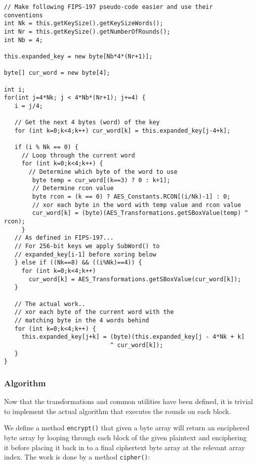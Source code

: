 \begin{lstlisting}
// Make following FIPS-197 pseudo-code easier and use their conventions
int Nk = this.getKeySize().getKeySizeWords();
int Nr = this.getKeySize().getNumberOfRounds();
int Nb = 4;

this.expanded_key = new byte[Nb*4*(Nr+1)];

byte[] cur_word = new byte[4];
  
int i;  
for(int j=4*Nk; j < 4*Nb*(Nr+1); j+=4) {
   i = j/4;
   
   // Get the next 4 bytes (word) of the key
   for (int k=0;k<4;k++) cur_word[k] = this.expanded_key[j-4+k];
   
   if (i % Nk == 0) {
     // Loop through the current word
     for (int k=0;k<4;k++) {
       // Determine which byte of the word to use
        byte temp = cur_word[(k==3) ? 0 : k+1];
        // Determine rcon value
        byte rcon = (k == 0) ? AES_Constants.RCON[(i/Nk)-1] : 0;
        // xor each byte in the word with temp value and rcon value
        cur_word[k] = (byte)(AES_Transformations.getSBoxValue(temp) ^ rcon);
     }
   // As defined in FIPS-197...
   // For 256-bit keys we apply SubWord() to
   // expanded_key[i-1] before xoring below
   } else if ((Nk==8) && ((i%Nk)==4)) {
     for (int k=0;k<4;k++)
       cur_word[k] = AES_Transformations.getSBoxValue(cur_word[k]);
   }
   
   // The actual work..
   // xor each byte of the current word with the
   // matching byte in the 4 words behind
   for (int k=0;k<4;k++) {
     this.expanded_key[j+k] = (byte)(this.expanded_key[j - 4*Nk + k]
                              ^ cur_word[k]);
   }
}
\end{lstlisting}
    
    \subsubsection{Algorithm}
    
    Now that the transformations and common utilities have been defined, it is trivial to implement the actual algorithm that executes the rounds on each block.
    
    We define a method \verb!encrypt()! that given a byte array will return an enciphered byte array by looping through each block of the given plaintext and enciphering it before placing it back in to a final ciphertext byte array at the relevant array index. The work is done by a method \verb!cipher()!: \\
    
